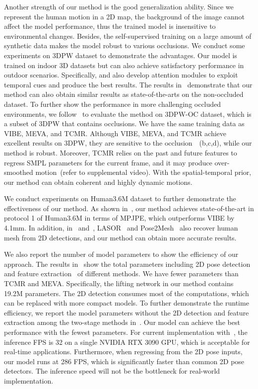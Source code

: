 Another strength of our method is the good generalization ability. Since we represent the human motion in a 2D map, the background of the image cannot affect the model performance, thus the trained model is insensitive to environmental changes. Besides, the self-supervised training on a large amount of synthetic data makes the model robust to various occlusions. We conduct some experiments on 3DPW dataset to demonstrate the advantages. Our model is trained on indoor 3D datasets but can also achieve satisfactory performance in outdoor scenarios. Specifically, \cite{wan2021encoder} and \cite{chen2021self} also develop attention modules to exploit temporal cues and produce the best results. The results in~ demonstrate that our method can also obtain similar results as state-of-the-arts on the non-occluded dataset. To further show the performance in more challenging occluded environments, we follow~\cite{zhang2020object} to evaluate the method on 3DPW-OC dataset, which is a subset of 3DPW that contains occlusions. We have the same training data as VIBE, MEVA, and TCMR. Although VIBE, MEVA, and TCMR achieve excellent results on 3DPW, they are sensitive to the occlusion~~(b,c,d), while our method is robust. Moreover, TCMR relies on the past and future features to regress SMPL parameters for the current frame, and it may produce over-smoothed motion~(refer to supplemental video). With the spatial-temporal prior, our method can obtain coherent and highly dynamic motions.


We conduct experiments on Human3.6M dataset to further demonstrate the effectiveness of our method. As shown in~, our method achieves state-of-the-art in protocol 1 of Human3.6M in terms of MPJPE, which outperforms VIBE by 4.1mm. In addition, in~ and~, LASOR~\cite{yang2022lasor} and Pose2Mesh~\cite{choi2020pose2mesh} also recover human mesh from 2D detections, and our method can obtain more accurate results.

We also report the number of model parameters to show the efficiency of our approach. The results in~ show the total parameters including 2D pose detection~\cite{cao2017realtime} and feature extraction~\cite{kolotouros2019learning} of different methods. We have fewer parameters than TCMR and MEVA. Specifically, the lifting network in our method contains 19.2M parameters. The 2D detection consumes most of the computations, which can be replaced with more compact models. To further demonstrate the runtime efficiency, we report the model parameters without the 2D detection and feature extraction among the two-stage methods in~. Our model can achieve the best performance with the fewest parameters. For current implementation with~\cite{cao2017realtime}, the inference FPS is 32 on a single NVIDIA RTX 3090 GPU, which is acceptable for real-time applications. Furthermore, when regressing from the 2D pose inputs, our model runs at 286 FPS, which is significantly faster than common 2D pose detectors. The inference speed will not be the bottleneck for real-world implementation.

